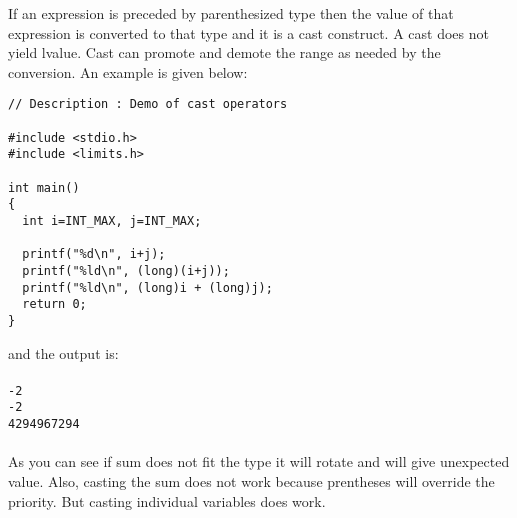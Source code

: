 If an expression is preceded by parenthesized type then the value of that
expression is converted to that type and it is a cast construct. A cast does
not yield lvalue. Cast can promote and demote the range as needed by the
conversion. An example is given below:

\begin{verbatim}
// Description : Demo of cast operators

#include <stdio.h>
#include <limits.h>

int main()
{
  int i=INT_MAX, j=INT_MAX;

  printf("%d\n", i+j);
  printf("%ld\n", (long)(i+j));
  printf("%ld\n", (long)i + (long)j);
  return 0;
}
\end{verbatim}

and the output is:
\\\\\texttt{-2\\
-2\\
4294967294\\\\}
As you can see if sum does not fit the type it will rotate and will give
unexpected value. Also, casting the sum does not work because prentheses will
override the priority. But casting individual variables does work.
